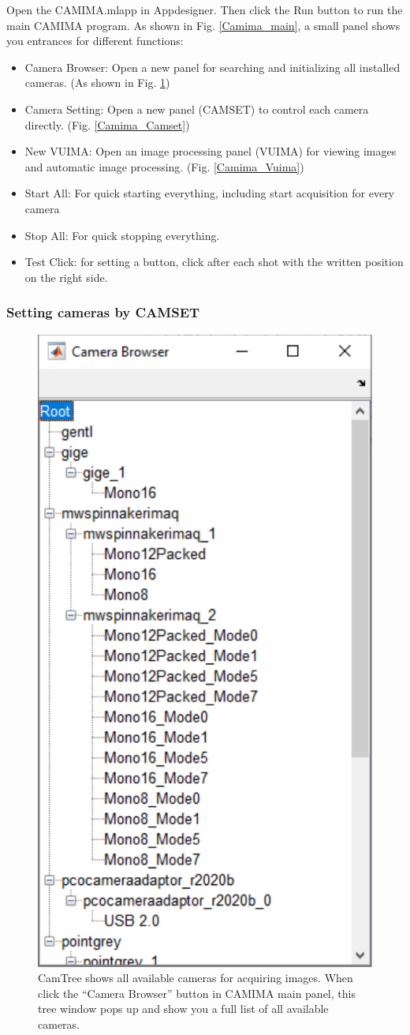 Open the CAMIMA.mlapp in Appdesigner. Then click the Run button to run the main CAMIMA program. As shown in Fig. \ref{Camima_main}, a small panel shows you entrances for different functions:
\begin{itemize}[noitemsep,topsep=0pt]
    \item Camera Browser: Open a new panel for searching and initializing all installed cameras. (As shown in Fig. \ref{Camima_CamTree})
    \item Camera Setting: Open a new panel (CAMSET) to control each camera directly. (Fig. \ref{Camima_Camset})
    \item New VUIMA: Open an image processing panel (VUIMA) for viewing images and automatic image processing. (Fig. \ref{Camima_Vuima})
    \item Start All: For quick starting everything, including start acquisition for every camera
    \item Stop All: For quick stopping everything.
    \item Test Click: for setting a button, click after each shot with the written position on the right side.
\end{itemize}

\subsubsection{Setting cameras by CAMSET}

\begin{figure}[htb]
\begin{center}
\includegraphics [width = 0.4 \linewidth]{figures/Camima_CamTree.pdf}
\end{center}
\caption[CamTree: show all available cameras for acquiring images]{CamTree shows all available cameras for acquiring images. When click the ``Camera Browser'' button in CAMIMA main panel, this tree window pops up and show you a full list of all available cameras.}
\label{Camima_CamTree}
\end{figure}

